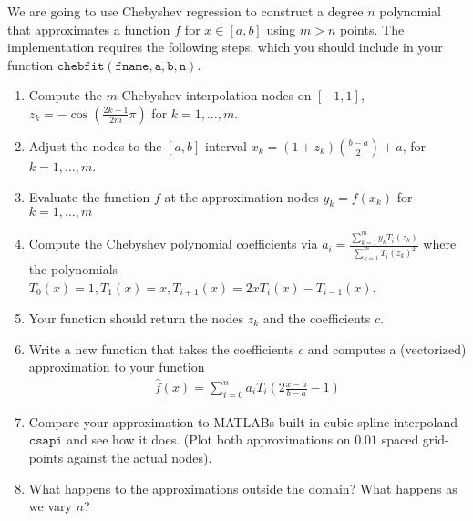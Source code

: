 \documentclass{article}
\begin{document}
We are going to use Chebyshev regression to construct a degree $n$ polynomial that approximates a function $f$ for $x \in [a,b]$ using $m > n $ points. The implementation requires the following steps, which you should include in your function $\mathtt{chebfit(fname,a,b,n)}$.
\begin{enumerate}
\item Compute the $m$ Chebyshev interpolation nodes on $[-1,1]$, $z_k = - \cos\left(\frac{2k-1}{2m} \pi \right)$ for $k=1,\ldots, m$.
\item Adjust the nodes to the $[a,b]$ interval $x_k = (1+z_k) \left(\frac{b-a}{2} \right) + a$, for $k=1,\ldots,m$.
\item Evaluate the function $f$ at the approximation nodes $y_k = f(x_k)$  for $k=1,\ldots,m$
\item Compute the Chebyshev polynomial coefficients via $a_i = \frac{\sum_{k=1}^m y_k T_i(z_k)}{\sum_{k=1}^m  T_i(z_k)^2}$ where the polynomials\\ $T_0(x) = 1, T_1(x) = x, T_{i+1}(x) = 2xT_i(x) - T_{i-1}(x)$. 
\item Your function should return the nodes $z_k$ and the coefficients $c$.
\item Write a new function that takes the coefficients $c$ and computes a (vectorized) approximation to your function
\begin{eqnarray*}
\hat{f}(x) = \sum_{i=0}^n a_i T_i \left( 2 \frac{x-a}{b-a} -1 \right)
\end{eqnarray*}
\item Compare your approximation to MATLABs built-in cubic spline interpoland $\mathtt{csapi}$ and see how it does. (Plot both approximations on $0.01$ spaced grid-points against the actual nodes).
\item What happens to the approximations outside the domain? What happens as we vary $n$?

\end{enumerate}
\end{document}
